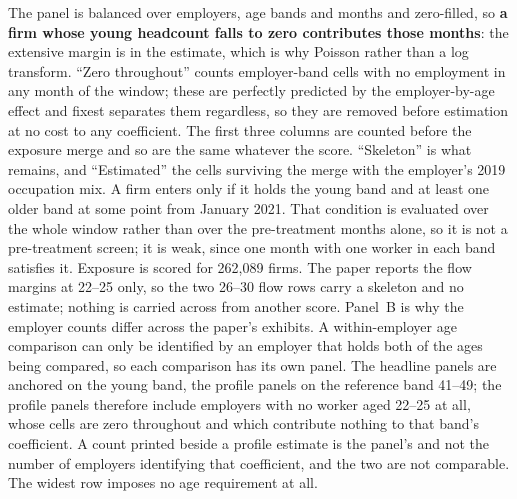\begin{table}[ht!]
\begin{minipage}{0.95\textwidth}\footnotesize\vspace{4pt}The panel is balanced over employers, age bands and months and zero-filled, so \textbf{a firm whose young headcount falls to zero contributes those months}: the extensive margin is in the estimate, which is why Poisson rather than a log transform. ``Zero throughout'' counts employer-band cells with no employment in any month of the window; these are perfectly predicted by the employer-by-age effect and fixest separates them regardless, so they are removed before estimation at no cost to any coefficient. The first three columns are counted before the exposure merge and so are the same whatever the score. ``Skeleton'' is what remains, and ``Estimated'' the cells surviving the merge with the employer's 2019 occupation mix. A firm enters only if it holds the young band and at least one older band at some point from January 2021. That condition is evaluated over the whole window rather than over the pre-treatment months alone, so it is not a pre-treatment screen; it is weak, since one month with one worker in each band satisfies it. Exposure is scored for 262{,}089 firms. The paper reports the flow margins at 22--25 only, so the two 26--30 flow rows carry a skeleton and no estimate; nothing is carried across from another score. Panel~B is why the employer counts differ across the paper's exhibits. A within-employer age comparison can only be identified by an employer that holds both of the ages being compared, so each comparison has its own panel. The headline panels are anchored on the young band, the profile panels on the reference band 41--49; the profile panels therefore include employers with no worker aged 22--25 at all, whose cells are zero throughout and which contribute nothing to that band's coefficient. A count printed beside a profile estimate is the panel's and not the number of employers identifying that coefficient, and the two are not comparable. The widest row imposes no age requirement at all.
\end{minipage}
\end{table}
